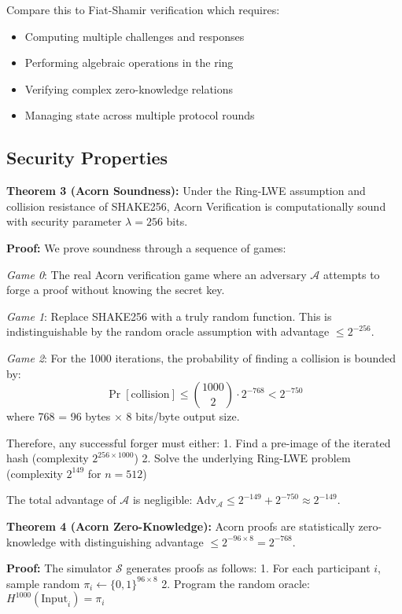 \documentclass[11pt,a4paper]{article}
\begin{document}
Compare this to Fiat-Shamir verification which requires:
\begin{itemize}
\item Computing multiple challenges and responses
\item Performing algebraic operations in the ring
\item Verifying complex zero-knowledge relations
\item Managing state across multiple protocol rounds
\end{itemize}

\subsection{Security Properties}

\textbf{Theorem 3 (Acorn Soundness):} Under the Ring-LWE assumption and collision resistance of SHAKE256, Acorn Verification is computationally sound with security parameter $\lambda = 256$ bits.

\textbf{Proof:} We prove soundness through a sequence of games:

\textit{Game 0}: The real Acorn verification game where an adversary $\mathcal{A}$ attempts to forge a proof without knowing the secret key.

\textit{Game 1}: Replace SHAKE256 with a truly random function. This is indistinguishable by the random oracle assumption with advantage $\leq 2^{-256}$.

\textit{Game 2}: For the 1000 iterations, the probability of finding a collision is bounded by:
\begin{equation}
\Pr[\text{collision}] \leq \binom{1000}{2} \cdot 2^{-768} < 2^{-750}
\end{equation}
where 768 = 96 bytes × 8 bits/byte output size.

Therefore, any successful forger must either:
1. Find a pre-image of the iterated hash (complexity $2^{256 \times 1000}$)
2. Solve the underlying Ring-LWE problem (complexity $2^{149}$ for $n=512$)

The total advantage of $\mathcal{A}$ is negligible: $\text{Adv}_{\mathcal{A}} \leq 2^{-149} + 2^{-750} \approx 2^{-149}$.

\textbf{Theorem 4 (Acorn Zero-Knowledge):} Acorn proofs are statistically zero-knowledge with distinguishing advantage $\leq 2^{-96 \times 8} = 2^{-768}$.

\textbf{Proof:} The simulator $\mathcal{S}$ generates proofs as follows:
1. For each participant $i$, sample random $\pi_i \leftarrow \{0,1\}^{96 \times 8}$
2. Program the random oracle: $H^{1000}(\text{Input}_i) = \pi_i$
\end{document}
